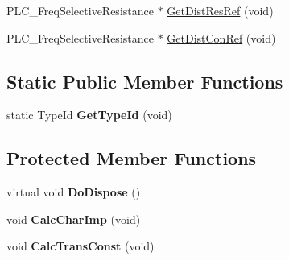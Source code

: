 \begin{DoxyCompactItemize}
\item 
\-P\-L\-C\-\_\-\-Freq\-Selective\-Resistance $\ast$ \hyperlink{classns3_1_1PLC__Cable_a6d56a49753e96196990474f68a2d4ee5}{\-Get\-Dist\-Res\-Ref} (void)
\item 
\-P\-L\-C\-\_\-\-Freq\-Selective\-Resistance $\ast$ \hyperlink{classns3_1_1PLC__Cable_a5e917bd164a75c139c4c20e55cd55a7f}{\-Get\-Dist\-Con\-Ref} (void)
\end{DoxyCompactItemize}
\subsection*{\-Static \-Public \-Member \-Functions}
\begin{DoxyCompactItemize}
\item 
\hypertarget{classns3_1_1PLC__Cable_af9d947e4c9acbcfe90fe1f01abe01958}{static \-Type\-Id {\bfseries \-Get\-Type\-Id} (void)}\label{classns3_1_1PLC__Cable_af9d947e4c9acbcfe90fe1f01abe01958}

\end{DoxyCompactItemize}
\subsection*{\-Protected \-Member \-Functions}
\begin{DoxyCompactItemize}
\item 
\hypertarget{classns3_1_1PLC__Cable_a9f8219844d8a0663a280faee130a38f0}{virtual void {\bfseries \-Do\-Dispose} ()}\label{classns3_1_1PLC__Cable_a9f8219844d8a0663a280faee130a38f0}

\item 
\hypertarget{classns3_1_1PLC__Cable_a7496b6ac6c63ce30273bdec71a1bc98b}{void {\bfseries \-Calc\-Char\-Imp} (void)}\label{classns3_1_1PLC__Cable_a7496b6ac6c63ce30273bdec71a1bc98b}

\item 
\hypertarget{classns3_1_1PLC__Cable_a7747327635fcafdbbe8abe9b0db2e3b0}{void {\bfseries \-Calc\-Trans\-Const} (void)}\label{classns3_1_1PLC__Cable_a7747327635fcafdbbe8abe9b0db2e3b0}

\end{DoxyCompactItemize}
